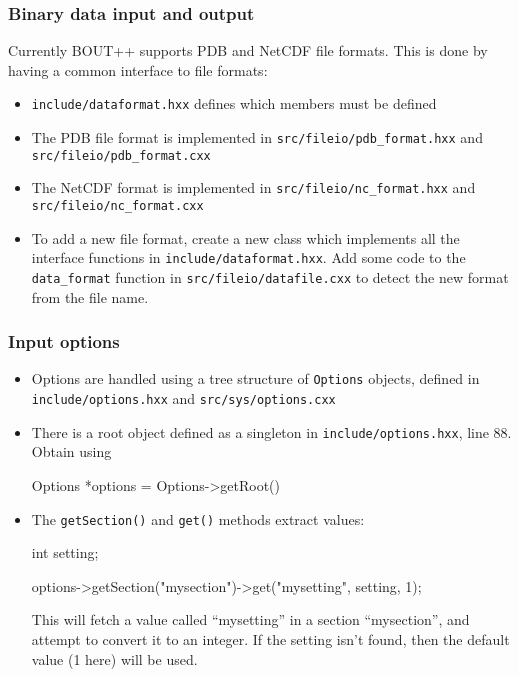 \documentclass{beamer}
\begin{document}
\begin{frame}
  \frametitle{Binary data input and output}
  
  Currently BOUT++ supports PDB and NetCDF file formats. This
  is done by having a common interface to file formats: 
  \begin{itemize} 
  \item \texttt{include/dataformat.hxx} defines which members must be defined
  \item The PDB file format is implemented in \texttt{src/fileio/pdb\_format.hxx} and \texttt{src/fileio/pdb\_format.cxx}
  \item The NetCDF format is implemented in \texttt{src/fileio/nc\_format.hxx} and \texttt{src/fileio/nc\_format.cxx}
  \item To add a new file format, create a new class which implements all the interface functions in \texttt{include/dataformat.hxx}. Add some code to
    the \texttt{data\_format} function in \texttt{src/fileio/datafile.cxx}
    to detect the new format from the file name.
  \end{itemize}
\end{frame}

\begin{frame}
  \frametitle{Input options}
  
  \begin{itemize}
  \item Options are handled using a tree structure of \texttt{Options}
    objects, defined in \texttt{include/options.hxx} and \texttt{src/sys/options.cxx}
    
  \item There is a root object defined as a singleton in \texttt{include/options.hxx}, line 88. Obtain using
    \begin{semiverbatim}
      Options *options = Options->getRoot()
    \end{semiverbatim}
  \item The \texttt{getSection()} and \texttt{get()} methods extract values:
    \begin{semiverbatim}
      int setting;

      options->getSection("mysection")->get("mysetting", setting, 1);
    \end{semiverbatim}
    This will fetch a value called ``mysetting'' in a section ``mysection'',
    and attempt to convert it to an integer. 
    If the setting isn't found, then the default value (1 here) will be used.
  \end{itemize}
\end{frame}
\end{document}
